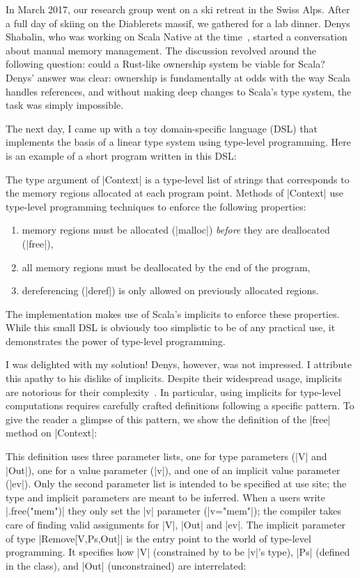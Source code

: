 In March 2017, our research group went on a ski retreat in the Swiss Alps.
After a full day of skiing on the Diablerets massif, we gathered for a lab dinner.
Denys Shabalin, who was working on Scala Native at the time~\citep{shabalin2020just}, started a conversation about manual memory management.
The discussion revolved around the following question: could a Rust-like ownership system be viable for Scala?
Denys' answer was clear: ownership is fundamentally at odds with the way Scala handles references, and without making deep changes to Scala's type system, the task was simply impossible.

The next day, I came up with a toy domain-specific language (DSL) that implements the basis of a linear type system using type-level programming.
Here is an example of a short program written in this DSL:

\memImplicitMain

\noindent
The type argument of |Context| is a type-level list of strings that corresponds to the memory regions allocated at each program point.
Methods of |Context| use type-level programming techniques to enforce the following properties:

\begin{enumerate}
  \item memory regions must be allocated (|malloc|) \emph{before} they are deallocated (|free|),
  \item all memory regions must be deallocated by the end of the program,
  \item dereferencing (|deref|) is only allowed on previously allocated regions.
\end{enumerate}

\noindent
The implementation makes use of Scala's implicits to enforce these properties.
While this small DSL is obviously too simplistic to be of any practical use, it demonstrates the power of type-level programming.

I was delighted with my solution!
Denys, however, was not impressed.
I attribute this apathy to his dislike of implicits.
Despite their widespread usage, implicits are notorious for their complexity~\citep{kvrikava2019scala}.
In particular, using implicits for type-level computations requires carefully crafted definitions following a specific pattern.
To give the reader a glimpse of this pattern, we show the definition of the |free| method on |Context|:

\memImplicitContextFree

\noindent
This definition uses three parameter lists, one for type parameters (|V| and |Out|), one for a value parameter (|v|), and one of an implicit value parameter (|ev|).
Only the second parameter list is intended to be specified at use site; the type and implicit parameters are meant to be inferred.
When a users write |.free("mem")| they only set the |v| parameter (|v="mem"|); the compiler takes care of finding valid assignments for |V|, |Out| and |ev|.
The implicit parameter of type |Remove[V,Ps,Out]| is the entry point to the world of type-level programming.
It specifies how |V| (constrained by to be |v|'s type), |Ps| (defined in the class), and |Out| (unconstrained) are interrelated:

